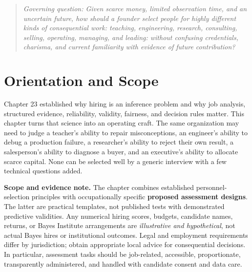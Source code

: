 
\begin{quote}
\textit{Governing question: Given scarce money, limited observation time, and an uncertain future, how should a founder select people for highly different kinds of consequential work: teaching, engineering, research, consulting, selling, operating, managing, and leading: without confusing credentials, charisma, and current familiarity with evidence of future contribution?}
\end{quote}

\vspace{1.5pt}

\section*{Orientation and Scope}

Chapter 23 established why hiring is an inference problem and why job analysis, structured evidence, reliability, validity, fairness, and decision rules matter. This chapter turns that science into an operating craft. The same organization may need to judge a teacher's ability to repair misconceptions, an engineer's ability to debug a production failure, a researcher's ability to reject their own result, a salesperson's ability to diagnose a buyer, and an executive's ability to allocate scarce capital. None can be selected well by a generic interview with a few technical questions added.

\textbf{Scope and evidence note.} The chapter combines established personnel-selection principles with occupationally specific \textbf{proposed assessment designs}. The latter are practical templates, not published tests with demonstrated predictive validities. Any numerical hiring scores, budgets, candidate names, returns, or Bayes Institute arrangements are \textit{illustrative and hypothetical}, not actual Bayes hires or institutional outcomes. Legal and employment requirements differ by jurisdiction; obtain appropriate local advice for consequential decisions. In particular, assessment tasks should be job-related, accessible, proportionate, transparently administered, and handled with candidate consent and data care.

